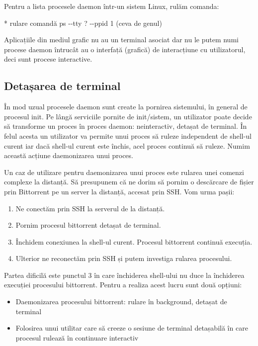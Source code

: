 Pentru a lista procesele daemon într-un sistem Linux, rulăm comanda:

* rulare comandă ps -{}-tty ? -{}-ppid 1 (ceva de genul)

Aplicațiile din mediul grafic nu au un terminal asociat dar nu le putem numi
procese daemon întrucât au o interfață (grafică) de interacțiune cu
utilizatorul, deci sunt procese interactive.

\subsection{Detașarea de terminal}
\label{sec:procese-interactivitate-detasare}

În mod uzual procesele daemon sunt create la pornirea sistemului, în general de
procesul init. Pe lângă serviciile pornite de init/sistem, un utilizator poate
decide să transforme un proces în proces daemon: neinteractiv, detașat de
terminal. În felul acesta un utilizator va permite unui proces să ruleze
independent de shell-ul curent iar dacă shell-ul curent este închis, acel proces
continuă să ruleze. Numim această acțiune daemonizarea unui proces.

Un caz de utilizare pentru daemonizarea unui proces este rularea unei comenzi
complexe la distanță. Să presupunem că ne dorim să pornim o descărcare de fișier
prin Bittorrent pe un server la distanță, accesat prin SSH. Vom urma pașii:

\begin{enumerate}
	\item Ne conectăm prin SSH la serverul de la distanță.
	\item Pornim procesul bittorrent detașat de terminal.
	\item Închidem conexiunea la shell-ul curent. Procesul bittorrent
		continuă execuția.
	\item Ulterior ne reconectăm prin SSH și putem investiga rularea
		procesului.
\end{enumerate}

Partea dificilă este punctul 3 în care închiderea shell-ului nu duce la
închiderea execuției procesului bittorrent. Pentru a realiza acest lucru sunt
două opțiuni:

\begin{itemize}
	\item Daemonizarea procesului bittorrent: rulare în background, detașat
		de terminal
	\item Folosirea unui utilitar care să creeze o sesiune de terminal
		detașabilă în care procesul rulează în continuare interactiv
\end{itemize}

